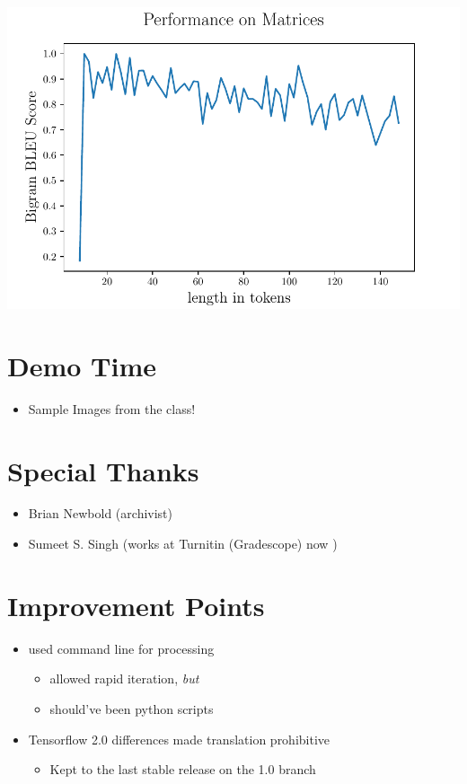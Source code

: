 \includegraphics{assets/scorebylenstacked.pdf}

\hypertarget{demo-time}{%
\section{Demo Time}\label{demo-time}}

\begin{itemize}
\tightlist
\item
  Sample Images from the class!
\end{itemize}

\hypertarget{special-thanks}{%
\section{Special Thanks}\label{special-thanks}}

\begin{itemize}
\item
  Brian Newbold (archivist)
\item
  Sumeet S. Singh (works at Turnitin (Gradescope) now )
\end{itemize}

\hypertarget{improvement-points}{%
\section{Improvement Points}\label{improvement-points}}

\begin{itemize}
\item
  used command line for processing

  \begin{itemize}
  \item
    allowed rapid iteration, \emph{but}
  \item
    should've been python scripts
  \end{itemize}
\item
  Tensorflow 2.0 differences made translation prohibitive

  \begin{itemize}
  \tightlist
  \item
    Kept to the last stable release on the 1.0 branch
  \end{itemize}
\end{itemize}

